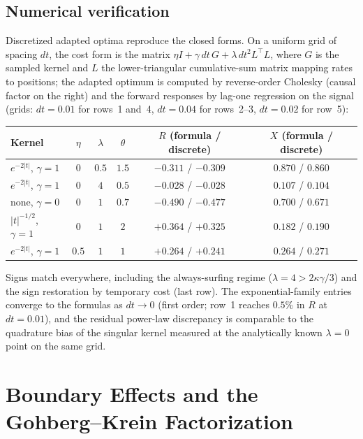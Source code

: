 \documentclass[11pt]{article}
\theoremstyle{plain}
\begin{document}
\subsection{Numerical verification}

Discretized adapted optima reproduce the closed forms. On a uniform grid of spacing $dt$, the cost form is the matrix $\eta I + \gamma\,dt\,G + \lambda\,dt^2 L^\top\!L$, where $G$ is the sampled kernel and $L$ the lower-triangular cumulative-sum matrix mapping rates to positions; the adapted optimum is computed by reverse-order Cholesky (causal factor on the right) and the forward responses by lag-one regression on the signal (grids: $dt=0.01$ for rows~1 and~4, $dt=0.04$ for rows~2--3, $dt=0.02$ for row~5):

\begin{center}
\begin{tabular}{lccccc}
\toprule
Kernel & $\eta$ & $\lambda$ & $\theta$ & $R$ (formula / discrete) & $X$ (formula / discrete)\\
\midrule
$e^{-2|t|}$, $\gamma{=}1$ & 0 & $0.5$ & $1.5$ & $-0.311$ / $-0.309$ & $0.870$ / $0.860$\\
$e^{-2|t|}$, $\gamma{=}1$ & 0 & $4$ & $0.5$ & $-0.028$ / $-0.028$ & $0.107$ / $0.104$\\
none, $\gamma{=}0$ & 0 & $1$ & $0.7$ & $-0.490$ / $-0.477$ & $0.700$ / $0.671$\\
$|t|^{-1/2}$, $\gamma{=}1$ & 0 & $1$ & $2$ & $+0.364$ / $+0.325$ & $0.182$ / $0.190$\\
$e^{-2|t|}$, $\gamma{=}1$ & $0.5$ & $1$ & $1$ & $+0.264$ / $+0.241$ & $0.264$ / $0.271$\\
\bottomrule
\end{tabular}
\end{center}

Signs match everywhere, including the always-surfing regime ($\lambda = 4 > 2\kappa\gamma/3$) and the sign restoration by temporary cost (last row). The exponential-family entries converge to the formulas as $dt\to0$ (first order; row~1 reaches $0.5\%$ in $R$ at $dt=0.01$), and the residual power-law discrepancy is comparable to the quadrature bias of the singular kernel measured at the analytically known $\lambda=0$ point on the same grid.

\section{Boundary Effects and the Gohberg--Krein Factorization}
\end{document}

